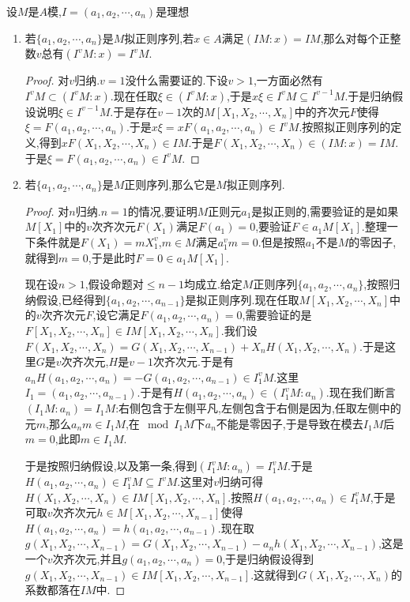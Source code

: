 设$M$是$A$模,$I=(a_1,a_2,\cdots,a_n)$是理想
\begin{enumerate}
	\item 若$\{a_1,a_2,\cdots,a_n\}$是$M$拟正则序列,若$x\in A$满足$(IM:x)=IM$,那么对每个正整数$v$总有$(I^vM:x)=I^vM$.
	\begin{proof}
		
		对$v$归纳.$v=1$没什么需要证的.下设$v>1$,一方面必然有$I^vM\subset(I^vM:x)$.现在任取$\xi\in(I^vM:x)$,于是$x\xi\in I^vM\subseteq I^{v-1}M$.于是归纳假设说明$\xi\in I^{v-1}M$.于是存在$v-1$次的$M[X_1,X_2,\cdots,X_n]$中的齐次元$F$使得$\xi=F(a_1,a_2,\cdots,a_n)$.于是$x\xi=xF(a_1,a_2,\cdots,a_n)\in I^vM$.按照拟正则序列的定义,得到$xF(X_1,X_2,\cdots,X_n)\in IM$.于是$F(X_1,X_2,\cdots,X_n)\in(IM:x)=IM$.于是$\xi=F(a_1,a_2,\cdots,a_n)\in I^vM$.
	\end{proof}
	\item 若$\{a_1,a_2,\cdots,a_n\}$是$M$正则序列,那么它是$M$拟正则序列.
	\begin{proof}
		
		对$n$归纳.$n=1$的情况,要证明$M$正则元$a_1$是拟正则的,需要验证的是如果$M[X_1]$中的$v$次齐次元$F(X_1)$满足$F(a_1)=0$,要验证$F\in a_1M[X_1]$.整理一下条件就是$F(X_1)=mX_1^v$,$m\in M$满足$a_1^vm=0$.但是按照$a_1$不是$M$的零因子,就得到$m=0$,于是此时$F=0\in a_1M[X_1]$.
		
		现在设$n>1$,假设命题对$\le n-1$均成立.给定$M$正则序列$\{a_1,a_2,\cdots,a_n\}$,按照归纳假设,已经得到$\{a_1,a_2,\cdots,a_{n-1}\}$是拟正则序列.现在任取$M[X_1,X_2,\cdots,X_n]$中的$v$次齐次元$F$,设它满足$F(a_1,a_2,\cdots,a_n)=0$,需要验证的是$F[X_1,X_2,\cdots,X_n]\in IM[X_1,X_2,\cdots,X_n]$.我们设$F(X_1,X_2,\cdots,X_n)=G(X_1,X_2,\cdots,X_{n-1})+X_nH(X_1,X_2,\cdots,X_n)$.于是这里$G$是$v$次齐次元,$H$是$v-1$次齐次元.于是有$a_nH(a_1,a_2,\cdots,a_n)=-G(a_1,a_2,\cdots,a_{n-1})\in I_1^vM$.这里$I_1=(a_1,a_2,\cdots,a_{n-1})$.于是有$H(a_1,a_2,\cdots,a_n)\in(I_1^vM:a_n)$.现在我们断言$(I_1M:a_n)=I_1M$:右侧包含于左侧平凡,左侧包含于右侧是因为,任取左侧中的元$m$,那么$a_nm\in I_1M$,在$\mod I_1M$下$a_n$不能是零因子,于是导致在模去$I_1M$后$m=0$,此即$m\in I_1M$.
		
		于是按照归纳假设,以及第一条,得到$(I_1^vM:a_n)=I_1^vM$.于是$H(a_1,a_2,\cdots,a_n)\in I_1^vM\subseteq I^vM$.这里对$v$归纳可得$H(X_1,X_2,\cdots,X_n)\in IM[X_1,X_2,\cdots,X_n]$.按照$H(a_1,a_2,\cdots,a_n)\in I_1^vM$,于是可取$v$次齐次元$h\in M[X_1,X_2,\cdots,X_{n-1}]$使得$H(a_1,a_2,\cdots,a_n)=h(a_1,a_2,\cdots,a_{n-1})$.现在取$g(X_1,X_2,\cdots,X_{n-1})=G(X_1,X_2,\cdots,X_{n-1})-a_nh(X_1,X_2,\cdots,X_{n-1})$,这是一个$v$次齐次元,并且$g(a_1,a_2,\cdots,a_n)=0$,于是归纳假设得到$g(X_1,X_2,\cdots,X_{n-1})\in IM[X_1,X_2,\cdots,X_{n-1}]$.这就得到$G(X_1,X_2,\cdots,X_n)$的系数都落在$IM$中.
	\end{proof}
\end{enumerate}

